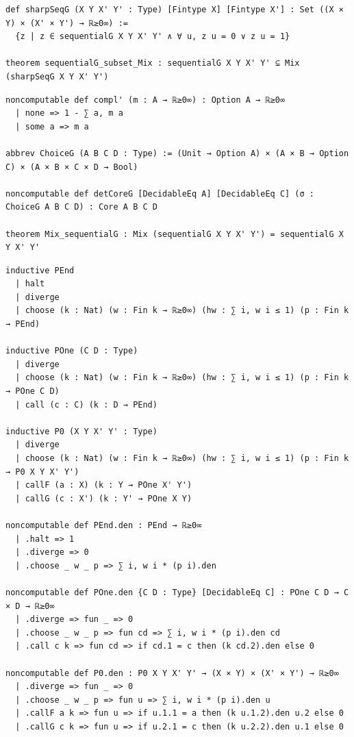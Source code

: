 \begin{lstlisting}
def sharpSeqG (X Y X' Y' : Type) [Fintype X] [Fintype X'] : Set ((X × Y) × (X' × Y') → ℝ≥0∞) :=
  {z | z ∈ sequentialG X Y X' Y' ∧ ∀ u, z u = 0 ∨ z u = 1}

theorem sequentialG_subset_Mix : sequentialG X Y X' Y' ⊆ Mix (sharpSeqG X Y X' Y')
\end{lstlisting}

\begin{lstlisting}
noncomputable def compl' (m : A → ℝ≥0∞) : Option A → ℝ≥0∞
  | none => 1 - ∑ a, m a
  | some a => m a

abbrev ChoiceG (A B C D : Type) := (Unit → Option A) × (A × B → Option C) × (A × B × C × D → Bool)

noncomputable def detCoreG [DecidableEq A] [DecidableEq C] (σ : ChoiceG A B C D) : Core A B C D

theorem Mix_sequentialG : Mix (sequentialG X Y X' Y') = sequentialG X Y X' Y'
\end{lstlisting}

\begin{lstlisting}
inductive PEnd
  | halt
  | diverge
  | choose (k : Nat) (w : Fin k → ℝ≥0∞) (hw : ∑ i, w i ≤ 1) (p : Fin k → PEnd)

inductive POne (C D : Type)
  | diverge
  | choose (k : Nat) (w : Fin k → ℝ≥0∞) (hw : ∑ i, w i ≤ 1) (p : Fin k → POne C D)
  | call (c : C) (k : D → PEnd)

inductive P0 (X Y X' Y' : Type)
  | diverge
  | choose (k : Nat) (w : Fin k → ℝ≥0∞) (hw : ∑ i, w i ≤ 1) (p : Fin k → P0 X Y X' Y')
  | callF (a : X) (k : Y → POne X' Y')
  | callG (c : X') (k : Y' → POne X Y)

noncomputable def PEnd.den : PEnd → ℝ≥0∞
  | .halt => 1
  | .diverge => 0
  | .choose _ w _ p => ∑ i, w i * (p i).den

noncomputable def POne.den {C D : Type} [DecidableEq C] : POne C D → C × D → ℝ≥0∞
  | .diverge => fun _ => 0
  | .choose _ w _ p => fun cd => ∑ i, w i * (p i).den cd
  | .call c k => fun cd => if cd.1 = c then (k cd.2).den else 0

noncomputable def P0.den : P0 X Y X' Y' → (X × Y) × (X' × Y') → ℝ≥0∞
  | .diverge => fun _ => 0
  | .choose _ w _ p => fun u => ∑ i, w i * (p i).den u
  | .callF a k => fun u => if u.1.1 = a then (k u.1.2).den u.2 else 0
  | .callG c k => fun u => if u.2.1 = c then (k u.2.2).den u.1 else 0
\end{lstlisting}

